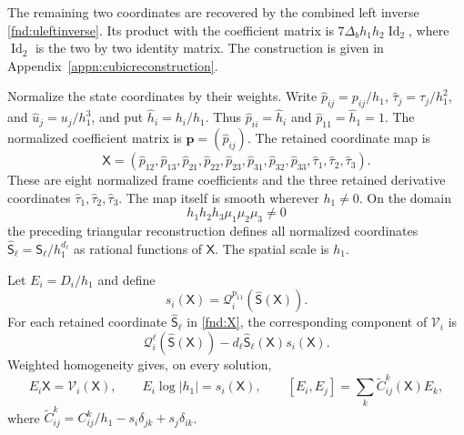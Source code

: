 \documentclass[11pt,a4paper]{article}
\numberwithin{equation}{section}
\theoremstyle{plain}
\theoremstyle{definition}
\theoremstyle{remark}
\begin{document}
The remaining two coordinates are recovered by the combined left
inverse \eqref{fnd:uleftinverse}. Its product with the coefficient matrix
is $7\Delta_bh_1h_2\operatorname{Id}_2$, where $\operatorname{Id}_2$ is the
two by two identity matrix.
The construction is given in Appendix~\ref{appn:cubicreconstruction}.

Normalize the state coordinates by their weights. Write
$\widehat p_{ij}=p_{ij}/h_1$,
$\widehat\tau_j=\tau_j/h_1^2$, and
$\widehat u_j=u_j/h_1^3$, and put
$\widehat h_i=h_i/h_1$. Thus $\widehat p_{ii}=\widehat h_i$ and
$\widehat p_{11}=\widehat h_1=1$.
The normalized coefficient matrix is
$\widehat{\boldsymbol p}=(\widehat p_{ij})$.
The retained coordinate map is
\begin{equation}\label{fnd:X}
\mathsf X=\left(\widehat p_{12},\widehat p_{13},\widehat p_{21},
\widehat p_{22},\widehat p_{23},\widehat p_{31},\widehat p_{32},\widehat p_{33},
\widehat\tau_1,\widehat\tau_2,\widehat\tau_3\right).
\end{equation}
These are eight normalized frame coefficients and the three retained
derivative coordinates $\widehat\tau_1,\widehat\tau_2,\widehat\tau_3$.
The map itself is smooth wherever $h_1\ne0$. On the domain
\begin{equation}\label{fnd:protected}
h_1h_2h_3\mu_1\mu_2\mu_3\ne0
\end{equation}
the preceding triangular reconstruction defines all normalized coordinates $\widehat{\mathsf S}_\ell=\mathsf S_\ell/h_1^{d_\ell}$ as rational functions of $\mathsf X$. The spatial scale is $h_1$.

Let $E_i=D_i/h_1$ and define
\[
 s_i(\mathsf X)=\mathcal Q_i^{p_{11}}(\widehat{\mathsf S}(\mathsf X)).
\]
For each retained coordinate $\widehat{\mathsf S}_\ell$ in \eqref{fnd:X},
the corresponding component of $\mathcal V_i$ is
\begin{equation}\label{fnd:normalizedfields}
 \mathcal Q_i^\ell(\widehat{\mathsf S}(\mathsf X))-
 d_\ell\widehat{\mathsf S}_\ell(\mathsf X)s_i(\mathsf X).
\end{equation}
Weighted homogeneity gives, on every solution,
\begin{equation}\label{fnd:actualnormalized}
E_i\mathsf X=\mathcal V_i(\mathsf X),\qquad E_i\log|h_1|=s_i(\mathsf X),\qquad
[E_i,E_j]=\sum_k\widetilde C^k_{ij}(\mathsf X)E_k,
\end{equation}
where $\widetilde C^k_{ij}=C^k_{ij}/h_1-s_i\delta_{jk}+s_j\delta_{ik}$.
\end{document}
